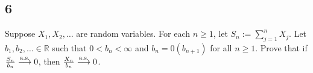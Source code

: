 \documentclass[12pt]{article}
\begin{document}
\subsection*{6}
\begin{tcolorbox}
Suppose $X_{1}, X_{2}, \hdots$ are random variables. For each $n \geq 1$, let $S_{n} := \sum_{j=1}^{n}X_{j}$. Let $b_{1}, b_{2}, \hdots \in
\mathbb{R}$ such that $0 < b_{n} < \infty$ and $b_{n} = \mathcal{0}(b_{n+1})$ for all $n \geq 1$. Prove that if 
$\frac{S_{n}}{b_{n}} \stackrel{\text{a.s.}}{\longrightarrow} 0$, then $\frac{X_{n}}{b_{n}} \stackrel{\text{a.s.}}{\longrightarrow} 0$.
\end{tcolorbox}
\end{document}
